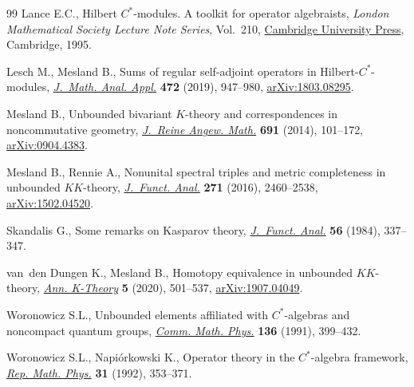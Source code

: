 \documentclass[pdftex]{sigma}
\numberwithin{equation}{section}
\begin{document}
\begin{thebibliography}{99}
Lance E.C., Hilbert {$C^*$}-modules. A toolkit for operator algebraists,
 \textit{London Mathematical Society Lecture Note Series}, Vol.~210, \href{https://doi.org/10.1017/CBO9780511526206}{Cambridge
 University Press}, Cambridge, 1995.

Lesch M., Mesland B., Sums of regular self-adjoint operators in
 {H}ilbert-{$C^*$}-modules, \href{https://doi.org/10.1016/j.jmaa.2018.11.059}{\textit{J.~Math. Anal. Appl.}} \textbf{472} (2019),
 947--980, \href{https://arxiv.org/abs/1803.08295}{arXiv:1803.08295}.

Mesland B., Unbounded bivariant {$K$}-theory and correspondences in
 noncommutative geometry, \href{https://doi.org/10.1515/crelle-2012-0076}{\textit{J.~Reine Angew. Math.}} \textbf{691} (2014),
 101--172, \href{https://arxiv.org/abs/0904.4383}{arXiv:0904.4383}.

Mesland B., Rennie A., Nonunital spectral triples and metric completeness in
 unbounded {$KK$}-theory, \href{https://doi.org/10.1016/j.jfa.2016.08.004}{\textit{J.~Funct. Anal.}} \textbf{271} (2016),
 2460--2538, \href{https://arxiv.org/abs/1502.04520}{arXiv:1502.04520}.

Skandalis G., Some remarks on {K}asparov theory, \href{https://doi.org/10.1016/0022-1236(84)90081-8}{\textit{J.~Funct. Anal.}}
 \textbf{56} (1984), 337--347.

van~den Dungen K., Mesland B., Homotopy equivalence in unbounded {$KK$}-theory,
 \href{https://doi.org/10.2140/akt.2020.5.501}{\textit{Ann. K-Theory}} \textbf{5} (2020), 501--537, \href{https://arxiv.org/abs/1907.04049}{arXiv:1907.04049}.

Woronowicz S.L., Unbounded elements affiliated with {$C^*$}-algebras and
 noncompact quantum groups, \href{https://doi.org/10.1007/BF02100032}{\textit{Comm. Math. Phys.}} \textbf{136} (1991),
 399--432.

Woronowicz S.L., Napi\'orkowski K., Operator theory in the {$C^*$}-algebra
 framework, \href{https://doi.org/10.1016/0034-4877(92)90025-V}{\textit{Rep. Math. Phys.}} \textbf{31} (1992), 353--371.

\end{thebibliography}\LastPageEnding
\end{document}
